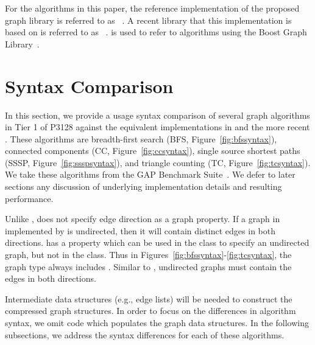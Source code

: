 \clearpage

For the algorithms in this paper, the reference implementation of the proposed graph library is referred to as \stdgraph~\cite{REF_stdgraph_library}. A recent library that this implementation is based on is referred to as \nwgraph~\cite{REF_nwgraph_paper,REF_nwgraph_library}.  \bgl is used to refer to algorithms using the Boost Graph Library~\cite{BGL}.  



\section{Syntax Comparison} \label{syntax}
In this section, we provide a usage syntax comparison of several 
graph algorithms in Tier 1 of P3128 against the equivalent implementations in 
\bgl and the more recent \nwgraph.
These algorithms are breadth-first search (BFS, Figure~\ref{fig:bfssyntax}),
connected components (CC, Figure~\ref{fig:ccsyntax}),
single source shortest paths (SSSP, Figure~\ref{fig:ssspsyntax}),
and triangle counting (TC, Figure~\ref{fig:tcsyntax}).
We take these algorithms from the GAP Benchmark Suite~\cite{beamer2015gap}.
We defer to later sections any discussion of
underlying implementation details and resulting performance.

Unlike \bgl, \stdgraph does not specify edge direction as a graph property.
If a graph in \stdgraph implemented by 
is undirected, then it will contain distinct edges in both directions.
\bgl has a  property
which can be used in the  class
to specify an undirected graph, but
not in the  class.
Thus in Figures~\ref{fig:bfssyntax}-\ref{fig:tcsyntax}, the \bgl graph type 
always includes .
Similar to \stdgraph, undirected graphs must contain the edges in both directions.

Intermediate data structures (e.g., edge lists) will be needed
to construct the compressed graph structures.
In order to focus on the differences in algorithm syntax, we omit
code which populates the graph data structures.
In the following subsections, we address the syntax differences for each of
these algorithms.


